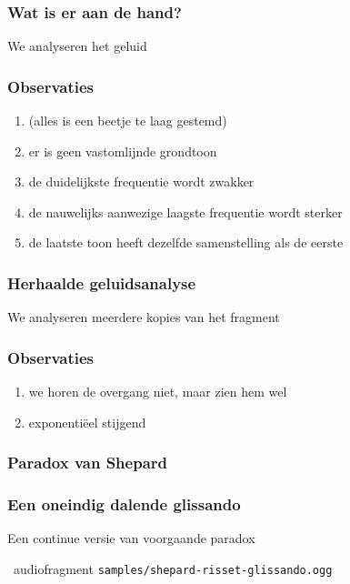 \documentclass[compress, darktitle, framenumber, totalframenumber]{beamer}
\begin{document}
\begin{frame}
  \frametitle{Wat is er aan de hand?}

  We analyseren het geluid
\end{frame}

\begin{frame}
  \frametitle{Observaties}

  \begin{enumerate}
    \item (alles is een beetje te laag gestemd)
    \item er is geen vastomlijnde grondtoon
    \item de duidelijkste frequentie wordt \alert{zwakker}
    \item de nauwelijks aanwezige laagste frequentie wordt \alert{sterker}
    \item de laatste toon heeft dezelfde samenstelling als de eerste
  \end{enumerate}
\end{frame}

\begin{frame}
  \frametitle{Herhaalde geluidsanalyse}

  We analyseren meerdere kopies van het fragment
\end{frame}

\begin{frame}
  \frametitle{Observaties}

  \begin{enumerate}
    \item we horen de overgang niet, maar \alert{zien} hem wel
    \item exponenti\"eel stijgend
  \end{enumerate}
\end{frame}

\begin{frame}
  \frametitle{Paradox van Shepard}
\end{frame}

\begin{frame}
  \frametitle{Een oneindig dalende glissando}

  Een continue versie van voorgaande paradox
  \begin{block}{\twonotes\ audiofragment}
    \texttt{samples/shepard-risset-glissando.ogg}
  \end{block}
\end{frame}
\end{document}
